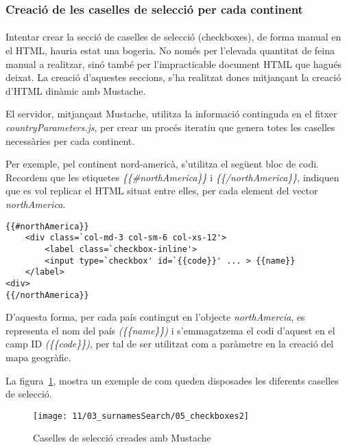 \subsubsection{Creació de les caselles de selecció per cada continent}

\paragraph{}
Intentar crear la secció de caselles de selecció (checkboxes), de forma manual en el HTML, hauria estat una bogeria. No només per l'elevada quantitat de feina manual a realitzar, sinó també per l'impracticable document HTML que hagués deixat. La creació d'aquestes seccions, s'ha realitzat doncs mitjançant la creació d'HTML dinàmic amb Mustache.

El servidor, mitjançant Mustache, utilitza la informació continguda en el fitxer \emph{countryParameters.js}, per crear un procés iteratiu que genera totes les caselles ne\-ce\-ssà\-ries per cada continent.

Per exemple, pel continent nord-americà, s'utilitza el següent bloc de codi. Recordem que les etiquetes \emph{\{\{\#northAmerica\}\}} i \emph{\{\{/northAmerica\}\}}, indiquen que es vol replicar el HTML situat entre elles, per cada element del vector \emph{northAmerica}.

\begin{lstlisting}[style=rawOwn,caption={Caselles de selecció creades mitjançant Mustache}]
{{#northAmerica}}
    <div class=`col-md-3 col-sm-6 col-xs-12'>
        <label class=`checkbox-inline'>
        <input type=`checkbox' id=`{{code}}' ... > {{name}}
    </label>
<div>
{{/northAmerica}}
\end{lstlisting}

D'aquesta forma, per cada país contingut en l’objecte \emph{northAmercia}, es representa el nom del país \emph{(\{\{name\}\})}  i s'emmagatzema el codi d'aquest en el camp ID \emph{(\{\{code\}\})}, per tal de ser utilitzat com a paràmetre en la creació del mapa geogràfic.

La figura~\ref{fig:checkboxes}, mostra un exemple de com queden disposades les diferents caselles de selecció.

\begin{figure}[h]
    \texttt{[image: 11/03\_surnamesSearch/05\_checkboxes2]}
    \centering
    \caption{Caselles de selecció creades amb Mustache}\label{fig:checkboxes}
\end{figure}
